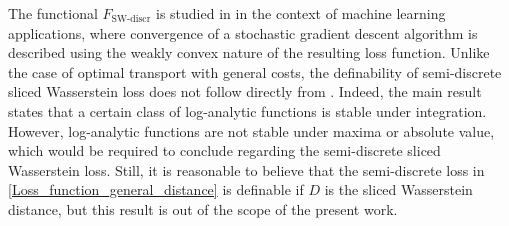 \documentclass[11pt]{article}
\newcommand{\1}{\mathbbm{1}}
\numberwithin{equation}{section}
\begin{document}
The functional $F_{\text{SW-discr}}$ is studied in \cite{tanguy2023convergence} in the context of machine learning applications, where convergence of a stochastic gradient descent algorithm is described using the weakly convex nature of the resulting loss function. Unlike the case of optimal transport with general costs, the definability of semi-discrete sliced Wasserstein loss does not follow directly from \cite[Theorem 1.3]{Cluckers2009StabilityUI}. Indeed, the main result states that a certain class of log-analytic functions is stable under integration. However, log-analytic functions are not stable under maxima or absolute value, which would be required to conclude regarding the semi-discrete sliced Wasserstein loss. Still, it is reasonable to believe that the semi-discrete loss in \eqref{Loss_function_general_distance} is definable if $D$ is the sliced Wasserstein distance, but this result is out of the scope of the present work. 
\end{document}
